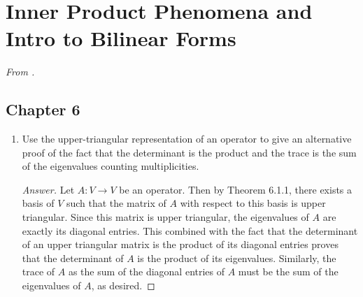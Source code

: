 \documentclass[../psets.tex]{subfiles}
\begin{document}
\section{Inner Product Phenomena and Intro to Bilinear Forms}
\emph{From \textcite{bib:Treil}.}
\subsection*{Chapter 6}
\begin{enumerate}[label={\textbf{1.\arabic*.}}]
    \item {}Use the upper-triangular representation of an operator to give an alternative proof of the fact that the determinant is the product and the trace is the sum of the eigenvalues counting multiplicities.
    \begin{proof}[Answer]
        Let $A:V\to V$ be an operator. Then by Theorem 6.1.1, there exists a basis of $V$ such that the matrix of $A$ with respect to this basis is upper triangular. Since this matrix is upper triangular, the eigenvalues of $A$ are exactly its diagonal entries. This combined with the fact that the determinant of an upper triangular matrix is the product of its diagonal entries proves that the determinant of $A$ is the product of its eigenvalues. Similarly, the trace of $A$ as the sum of the diagonal entries of $A$ must be the sum of the eigenvalues of $A$, as desired.
    \end{proof}
\end{enumerate}
\end{document}
